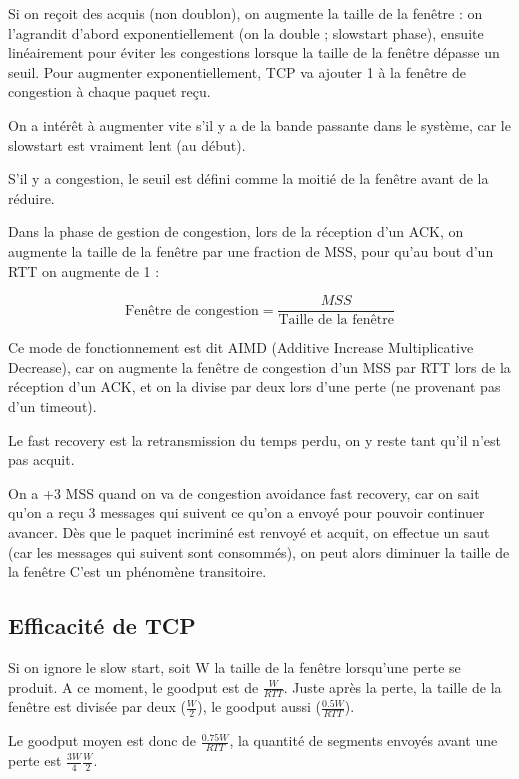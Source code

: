 Si on reçoit des acquis (non doublon), on augmente la taille de la fenêtre : on l'agrandit d'abord exponentiellement (on la double ; slowstart phase), ensuite linéairement pour éviter les congestions lorsque la taille de la fenêtre dépasse un seuil. Pour augmenter exponentiellement, TCP va ajouter 1 à la fenêtre de congestion à chaque paquet reçu.

On a intérêt à augmenter vite s'il y a de la bande passante dans le système, car le slowstart est vraiment lent (au début).

S'il y a congestion, le seuil est défini comme la moitié de la fenêtre avant de la réduire.

Dans la phase de gestion de congestion, lors de la réception d'un ACK, on augmente la taille de la fenêtre par une fraction de MSS, pour qu'au bout d'un RTT on augmente de 1 :  

$$\text{Fenêtre de congestion} = \frac{MSS}{\text{Taille de la fenêtre}}$$

Ce mode de fonctionnement est dit AIMD (Additive Increase Multiplicative Decrease), car on augmente la fenêtre de congestion d'un MSS par RTT	lors de la réception d'un ACK, et on la divise par deux lors d'une perte (ne provenant pas d'un timeout).

Le fast recovery est la retransmission du temps perdu, on y reste tant qu'il n'est pas acquit.


On a +3 MSS quand on va de congestion avoidance  fast recovery, car on sait qu'on a reçu 3 messages qui suivent ce qu'on a envoyé pour pouvoir continuer  avancer. Dès que le paquet incriminé est renvoyé et acquit, on effectue un saut (car les messages qui suivent sont consommés), on peut alors diminuer la taille de la fenêtre C'est un phénomène transitoire.

	\subsection{Efficacité de TCP}

Si on ignore le slow start, soit W la taille de la fenêtre lorsqu'une perte se produit. A ce moment, le goodput est de $\frac{W}{RTT}$. Juste après la perte, la taille de la fenêtre est divisée par deux ($ \frac{W}{2}$), le goodput aussi ($ \frac{0.5 W}{RTT}$).

Le goodput moyen est donc de $ \frac{0.75 W}{RTT}$, la quantité de segments envoyés avant une perte est $\frac{3W}{4} \frac{W}{2}$.

